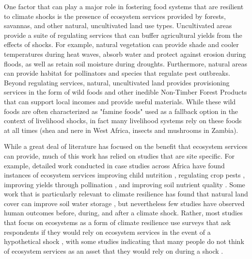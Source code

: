 \documentclass{article}
\begin{document}
One factor that can play a major role in fostering food systems that are resilient to climate shocks is the presence of ecosystem services provided by forests, savannas, and other natural, uncultivated land use types.  Uncultivated areas provide a suite of regulating services that can buffer agricultural yields from the effects of shocks.  For example, natural vegetation can provide shade and cooler temperatures during heat waves, absorb water and protect against erosion during floods, as well as retain soil moisture during droughts.  Furthermore, natural areas can provide habitat for pollinators and species that regulate pest outbreaks.  Beyond regulating services, natural, uncultivated land provides provisioning services in the form of wild foods and other inedible Non-Timber Forest Products that can support local incomes and provide useful materials.  While these wild foods are often characterized as "famine foods" used as a fallback option in the context of livelihood shocks, in fact many livelihood systems rely on these foods at all times (shea and nere in West Africa, insects and mushrooms in Zambia).

While a great deal of literature has focused on the benefit that ecosystem services can provide, much of this work has relied on studies that are site specific.  For example, detailed work conducted in case studies across Africa have found instances of ecosystem services improving child nutrition \cite{Golden2011}, regulating crop pests \cite{Girma2000}, improving yields through pollination \cite{Gemmil-Herren2008, Munyuli2012}, and improving soil nutrient quality \cite{Sileshi2012, Boffa2000, Siriri2009}.  Some work that is particularly relevant to climate resilience has found that natural land cover can improve soil water storage \cite{Siriri2013, Lott2009}, but nevertheless few studies have observed human outcomes before, during, and after a climate shock.  Rather, most studies that focus on ecosystems as a form of climate resilience use surveys that ask respondents if they would rely on ecosystem services in the event of a hypothetical shock \cite{Robledo2012}, with some studies indicating that many people do not think of ecosystem services as an asset that they would rely on during a shock \cite{Wunder2014}.
\end{document}
